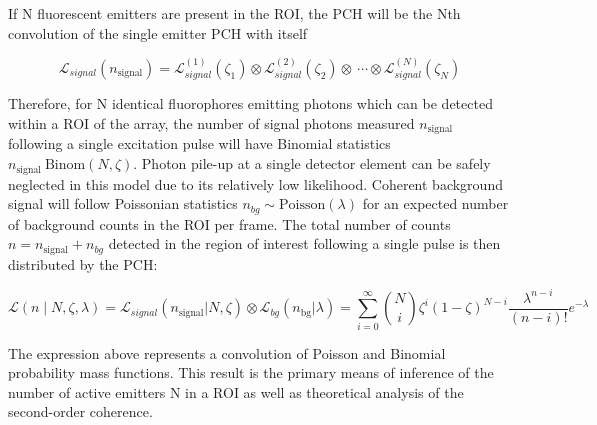 If N fluorescent emitters are present in the ROI, the PCH will be the Nth convolution of the single emitter PCH with itself \parencite{Chen1999}

\begin{equation}
\mathcal{L}_{signal}(n_{\mathrm{signal}})=\mathcal{L}_{signal}^{(1)}(\zeta_1)\otimes\mathcal{L}_{signal}^{(2)}(\zeta_2)\otimes\ \cdots\otimes\mathcal{L}_{signal}^{(N)}(\zeta_N)
\end{equation}

Therefore, for N identical fluorophores emitting photons which can be detected within a ROI of the array, the number of signal photons measured $n_{\mathrm{signal}}$ following a single excitation pulse will have Binomial statistics $n_{\mathrm{signal}}~\mathrm{Binom}\left(N,\zeta\right)$. Photon pile-up at a single detector element can be safely neglected in this model due to its relatively low likelihood. Coherent background signal will follow Poissonian statistics $n_{bg}\sim\mathrm{Poisson}\left(\lambda\right)$ for an expected number \lambda of background counts in the ROI per frame. The total number of counts $n=n_{\mathrm{signal}}+n_{bg}$ detected in the region of interest following a single pulse is then distributed by the PCH:

\begin{equation}
\mathcal{L}\left(n\mid N,\zeta,\lambda\right)=\mathcal{L}_{signal}(n_{\mathrm{signal}}\lvert N,\zeta)\otimes\mathcal{L}_{bg}(n_{\mathrm{bg}}\lvert \lambda)=\sum_{i=0}^{\infty}\binom{N}{i}\zeta^i\left(1-\zeta\right)^{N-i}\frac{\lambda^{n-i}}{\left(n-i\right)!}e^{-\lambda} 
\end{equation}

The expression above represents a convolution of Poisson and Binomial probability mass functions. This result is the primary means of inference of the number of active emitters N in a ROI as well as theoretical analysis of the second-order coherence. 




